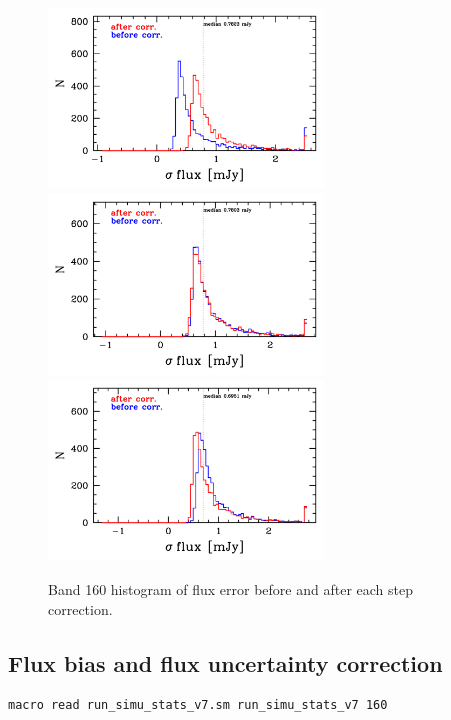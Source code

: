 \documentclass[11pt,a4paper]{article}
\begin{document}
\begin{figure}[H]
	\caption{
		Band 160 histogram of flux error before and after each step correction. 
	}
	\includegraphics[width=0.65\textwidth]{galsim_160_hist_uncertainty_1}
	\includegraphics[width=0.65\textwidth]{galsim_160_hist_uncertainty_2}
	\includegraphics[width=0.65\textwidth]{galsim_160_hist_uncertainty_3}
\end{figure}


\subsection{Flux bias and flux uncertainty correction}
\label{Band160_dfcorr}

\begin{lstlisting}[language=bash]
macro read run_simu_stats_v7.sm run_simu_stats_v7 160
\end{lstlisting}
\end{document}
